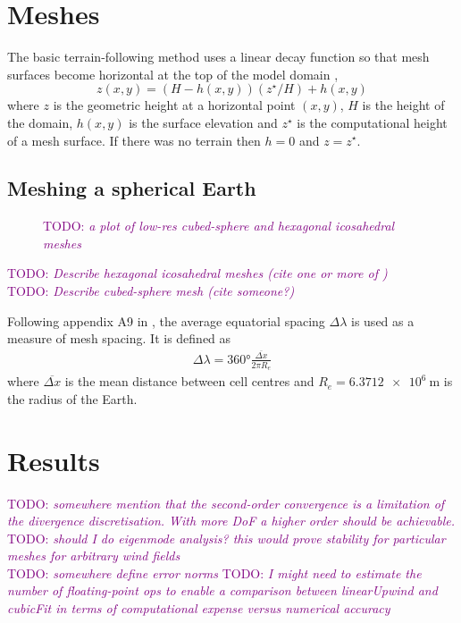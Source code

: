 \documentclass[times]{elsarticle}
\newcommand{\TODO}[1]{\textcolor{purple}{TODO: \emph{#1}}}
\begin{document}
\section{Meshes}

The basic terrain-following method uses a linear decay function so that mesh surfaces become horizontal at the top of the model domain \citep{galchen-somerville1975},
\begin{equation}
	z(x,y) = \left( H - h(x,y) \right) \left( z^\star / H \right) + h(x,y) \label{eqn:btf}
\end{equation}
where $z$ is the geometric height at a horizontal point $(x, y)$, $H$ is the height of the domain, $h(x,y)$ is the surface elevation and $z^\star$ is the computational height of a mesh surface.  If there was no terrain then $h = 0$ and $z = z^\star$.

\subsection{Meshing a spherical Earth}

\begin{figure}
	\caption{\TODO{a plot of low-res cubed-sphere and hexagonal icosahedral meshes}}
\end{figure}

\TODO{Describe hexagonal icosahedral meshes (cite one or more of \citep{thuburn2014,heikes-randall1995a,heikes-randall1995b})} \\
\TODO{Describe cubed-sphere mesh (cite someone?)}

Following appendix A9 in \citep{lauritzen2014}, the average equatorial spacing $\Delta \lambda$ is used as a measure of mesh spacing.  It is defined as
\begin{align}
	\Delta \lambda = \ang{360} \frac{\overline{\Delta x}}{2 \pi R_e}
\end{align}
where $\overline{\Delta x}$ is the mean distance between cell centres and $R_e = \SI{6.3712e6}{\meter}$ is the radius of the Earth.



\section{Results}
\label{sec:results}

\TODO{somewhere mention that the second-order convergence is a limitation of the divergence discretisation.  With more DoF a higher order should be achievable.} \\
\TODO{should I do eigenmode analysis?  this would prove stability for particular meshes for arbitrary wind fields} \\
\TODO{somewhere define error norms}
\TODO{I might need to estimate the number of floating-point ops to enable a comparison between linearUpwind and cubicFit in terms of computational expense versus numerical accuracy}
\end{document}
